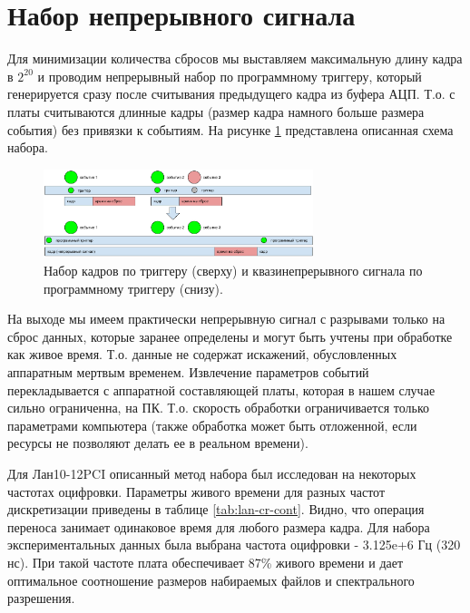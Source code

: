 \documentclass[a4paper,14pt]{extreport}
\begin{document}
\section{Набор непрерывного сигнала}

Для минимизации количества сбросов мы выставляем максимальную длину кадра в $ 2^{20} $ и проводим непрерывный набор по программному триггеру, который генерируется  сразу после считывания предыдущего кадра из буфера АЦП. Т.о. с платы считываются длинные кадры (размер кадра намного больше  размера события) без привязки к событиям. На рисунке \ref{fig:lan10-signal-acq} представлена описанная схема набора.

\begin{figure}
  \centering
  \includegraphics[width = 0.7\textwidth]{img/signals/signal-acq.pdf}
    \caption{Набор кадров по триггеру (сверху) и квазинепрерывного сигнала по программному триггеру (снизу).}
    \label{fig:lan10-signal-acq}
\end{figure}

На выходе мы имеем практически непрерывную сигнал с разрывами только на сброс данных, которые заранее определены и могут быть учтены при обработке как живое время. Т.о. данные не содержат искажений, обусловленных аппаратным мертвым временем. Извлечение параметров событий перекладывается с аппаратной составляющей платы, которая в нашем случае сильно ограниченна, на ПК. Т.о. скорость обработки ограничивается только параметрами компьютера (также обработка может быть отложенной, если ресурсы не позволяют делать ее в реальном времени). 

Для Лан10-12PCI описанный метод набора был исследован на некоторых частотах оцифровки. Параметры живого времени для разных частот дискретизации приведены в таблице \ref{tab:lan-cr-cont}. Видно, что операция переноса занимает одинаковое время для любого размера кадра. Для набора экспериментальных данных была выбрана частота оцифровки - 3.125e+6 Гц (320 нс). При такой частоте плата обеспечивает 87\% живого времени и дает оптимальное соотношение размеров набираемых файлов и спектрального разрешения.
\end{document}
